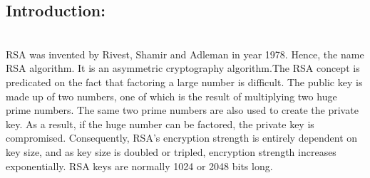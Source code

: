 \documentclass[a4paper]{report} %
\begin{document}
\subsection{Introduction:}\\
RSA was invented by Rivest, Shamir and Adleman in year 1978. Hence, the name RSA algorithm. It is an asymmetric cryptography algorithm.The RSA concept is predicated on the fact that factoring a large number is difficult. The public key is made up of two numbers, one of which is the result of multiplying two huge prime numbers. The same two prime numbers are also used to create the private key. As a result, if the huge number can be factored, the private key is compromised. Consequently, RSA's encryption strength is entirely dependent on key size, and as key size is doubled or tripled, encryption strength increases exponentially. RSA keys are normally 1024 or 2048 bits long.\\
\end{document}
